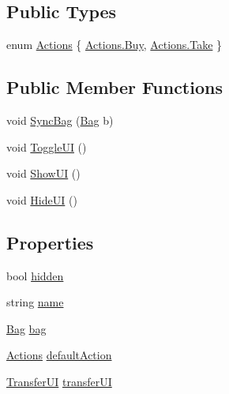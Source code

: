 \subsection*{Public Types}
\begin{DoxyCompactItemize}
\item 
enum \mbox{\hyperlink{class_container_behaviour_a8ad6b6c9b34c2e0abdaaf0627f87b036}{Actions}} \{ \mbox{\hyperlink{class_container_behaviour_a8ad6b6c9b34c2e0abdaaf0627f87b036a831a28f1e8df07c553fcd59546465d13}{Actions.\+Buy}}, 
\mbox{\hyperlink{class_container_behaviour_a8ad6b6c9b34c2e0abdaaf0627f87b036aa1df5b634fdadddf5a2170304c556b90}{Actions.\+Take}}
 \}
\end{DoxyCompactItemize}
\subsection*{Public Member Functions}
\begin{DoxyCompactItemize}
\item 
void \mbox{\hyperlink{class_container_behaviour_aea3c37f67bc244516f307f2c59a27b8f}{Sync\+Bag}} (\mbox{\hyperlink{class_bag}{Bag}} b)
\item 
void \mbox{\hyperlink{class_container_behaviour_a12b621fb47599b10bec679acb4cbe24e}{Toggle\+UI}} ()
\item 
void \mbox{\hyperlink{class_container_behaviour_ae4733d72cba5780939349f6d9beeba8f}{Show\+UI}} ()
\item 
void \mbox{\hyperlink{class_container_behaviour_a0641e9fa2407bee1d83f4998b78f1fa3}{Hide\+UI}} ()
\end{DoxyCompactItemize}
\subsection*{Properties}
\begin{DoxyCompactItemize}
\item 
bool \mbox{\hyperlink{class_container_behaviour_a07f292b549e9dbe4ac987ab2d4140910}{hidden}}
\item 
string \mbox{\hyperlink{class_container_behaviour_a9b00a643652cbf6ce3806130747c126b}{name}}
\item 
\mbox{\hyperlink{class_bag}{Bag}} \mbox{\hyperlink{class_container_behaviour_ab0e91f3cfb15de3442dbef4ac2885c21}{bag}}
\item 
\mbox{\hyperlink{class_container_behaviour_a8ad6b6c9b34c2e0abdaaf0627f87b036}{Actions}} \mbox{\hyperlink{class_container_behaviour_a1bcfbc4639219bfa29cec4b58101e589}{default\+Action}}
\item 
\mbox{\hyperlink{class_transfer_u_i}{Transfer\+UI}} \mbox{\hyperlink{class_container_behaviour_adf93ff57ab81d2e86d555aad6a4dbb8c}{transfer\+UI}}
\end{DoxyCompactItemize}


